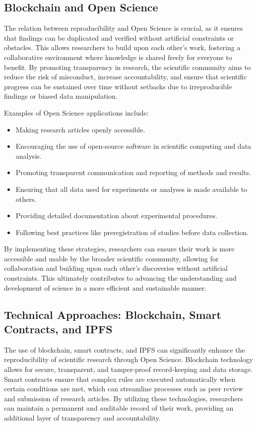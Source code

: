 \subsection{Blockchain and Open Science}

The relation between reproducibility and Open Science is crucial, as it ensures that findings can be duplicated and verified without artificial constraints or obstacles. This allows researchers to build upon each other's work, fostering a collaborative environment where knowledge is shared freely for everyone to benefit. By promoting transparency in research, the scientific community aims to reduce the risk of misconduct, increase accountability, and ensure that scientific progress can be sustained over time without setbacks due to irreproducible findings or biased data manipulation.

Examples of Open Science applications include:
\begin{itemize}
    \item Making research articles openly accessible.
    \item Encouraging the use of open-source software in scientific computing and data analysis.
    \item Promoting transparent communication and reporting of methods and results.
    \item Ensuring that all data used for experiments or analyses is made available to others.
    \item Providing detailed documentation about experimental procedures.
    \item Following best practices like preregistration of studies before data collection.
\end{itemize}

By implementing these strategies, researchers can ensure their work is more accessible and usable by the broader scientific community, allowing for collaboration and building upon each other's discoveries without artificial constraints. This ultimately contributes to advancing the understanding and development of science in a more efficient and sustainable manner.

\subsection{Technical Approaches: Blockchain, Smart Contracts, and IPFS}

The use of blockchain, smart contracts, and IPFS can significantly enhance the reproducibility of scientific research through Open Science. Blockchain technology allows for secure, transparent, and tamper-proof record-keeping and data storage. Smart contracts ensure that complex rules are executed automatically when certain conditions are met, which can streamline processes such as peer review and submission of research articles. By utilizing these technologies, researchers can maintain a permanent and auditable record of their work, providing an additional layer of transparency and accountability.

